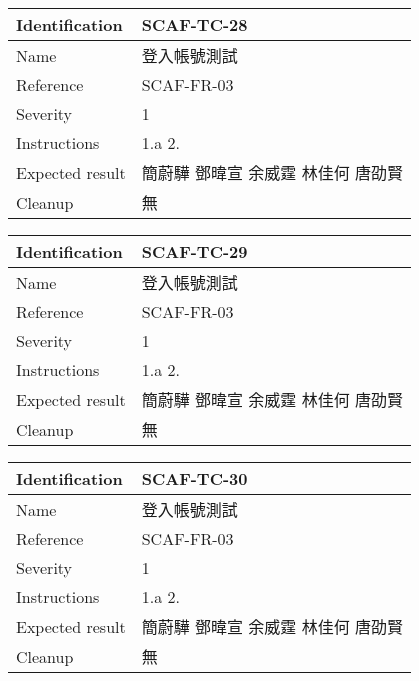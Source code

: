 \documentclass{report}
\begin{document}
\begin{tabularx}{0.9\textwidth}{
  |p{}%
  |p{}|%
  }
  \hline
  \centering Identification &  SCAF-TC-28 \\
  \hline
  \centering Name & 登入帳號測試 \\
  \hline
  \centering Reference & SCAF-FR-03 \\
  \hline
  \centering Severity & 1 \\
  \hline
  \centering Instructions & 1.a
                            2. \\
  \hline
  \centering Expected result & 簡蔚驊 \! 鄧暐宣 \! 余威霆 \! 林佳何 \! 唐劭賢 \\
  \hline
  \centering Cleanup & 無 \\
  \hline
\end{tabularx}
\newline\newline

\begin{tabularx}{0.9\textwidth}{
  |p{}%
  |p{}|%
  }
  \hline
  \centering Identification &  SCAF-TC-29 \\
  \hline
  \centering Name & 登入帳號測試 \\
  \hline
  \centering Reference & SCAF-FR-03 \\
  \hline
  \centering Severity & 1 \\
  \hline
  \centering Instructions & 1.a
                            2. \\
  \hline
  \centering Expected result & 簡蔚驊 \! 鄧暐宣 \! 余威霆 \! 林佳何 \! 唐劭賢 \\
  \hline
  \centering Cleanup & 無 \\
  \hline
\end{tabularx}
\newline\newline

\begin{tabularx}{0.9\textwidth}{
  |p{}%
  |p{}|%
  }
  \hline
  \centering Identification &  SCAF-TC-30 \\
  \hline
  \centering Name & 登入帳號測試 \\
  \hline
  \centering Reference & SCAF-FR-03 \\
  \hline
  \centering Severity & 1 \\
  \hline
  \centering Instructions & 1.a
                            2. \\
  \hline
  \centering Expected result & 簡蔚驊 \! 鄧暐宣 \! 余威霆 \! 林佳何 \! 唐劭賢 \\
  \hline
  \centering Cleanup & 無 \\
  \hline
\end{tabularx}
\newline\newline
\end{document}
